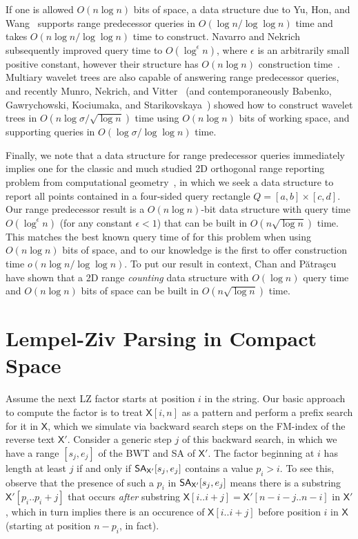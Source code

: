 \documentclass[11pt,runningheads]{llncs}
\def\SA{\mbox{\rm {\sf SA}}}
\def\X{\mathsf{X}}
\begin{document}
If one is allowed $O(n\log n)$ bits of space, a data structure due to Yu, Hon, and Wang~\cite{yhw2011}
supports range predecessor queries in $O(\log n/ \log \log n)$ time and takes 
$O(n\log n/ \log \log n)$ time to construct. Navarro and Nekrich~\cite{nn2012}
subsequently improved query time to $O(\log^\epsilon n)$,
where $\epsilon$ is an arbitrarily small positive constant, however their structure 
has $O(n\log n)$ construction time~\cite{nn2013-private}.
Multiary wavelet trees are also capable of answering range predecessor queries, and
recently Munro, Nekrich, and Vitter~\cite{MNV14} (and contemporaneously Babenko, Gawrychowski, Kociumaka, and 
Starikovskaya~\cite{BGKS15}) showed how to construct wavelet trees 
in $O(n\log\sigma/\sqrt{\log n})$ time using $O(n\log n)$ bits of working space, and
supporting queries in $O(\log \sigma/\log \log n)$ time.

Finally, we note that a data structure for range predecessor queries immediately implies one 
for the classic and much studied 2D orthogonal range reporting problem from computational 
geometry~\cite{chan2011orthogonal},
in which we seek a data structure to report all points contained in a four-sided query rectangle 
$Q = [a, b]\times[c, d]$. Our range predecessor result is a $O(n \log n)$-bit data structure 
with query time $O(\log^\epsilon n)$ (for any constant $\epsilon<1$)
that can be built in $O(n\sqrt{\log n})$ time. This matches the best 
known query time of for this problem when using $O(n \log n)$ bits of space, 
and to our knowledge is the first to offer construction time $o(n\log n/\log\log n)$.
To put our result in context, Chan and P{\u a}tra{\c s}cu~\cite{CP2010} have shown that a 
2D range {\em counting} data structure with $O(\log n)$ query time and $O(n\log n)$ bits of space can be 
built in $O(n \sqrt{\log n})$ time. 

\section{Lempel-Ziv Parsing in Compact Space}
\label{sec-basic}

Assume the next LZ factor starts at position $i$ in the string. Our basic approach 
to compute the factor is to treat $\X[i,n]$ as a pattern and perform a prefix search
for it in $\X$, which we simulate via backward search steps on the FM-index of the 
reverse text $\X'$. Consider a generic step $j$ of this backward search, in which we 
have a range $[s_j,e_j]$ of the BWT and SA of $\X'$. The factor beginning at $i$ 
has length at least $j$ if and only if $\SA_{\X'}[s_j,e_j]$ contains a value $p_i > i$.
To see this, observe that the presence of such a $p_i$ in $\SA_{\X'}[s_j,e_j]$ means
there is a substring $\X'[p_i..p_i+j]$ that occurs {\em after} substring 
$\X[i..i+j] = \X'[n-i-j..n-i]$ in $\X'$, which in turn implies there is an occurence of 
$\X[i..i+j]$ before position $i$ in $\X$ (starting at position $n-p_i$, in fact).
\end{document}
